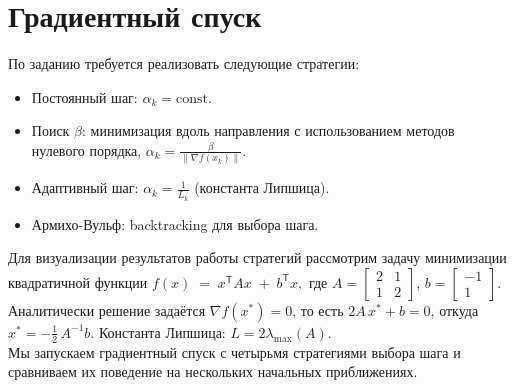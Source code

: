 \documentclass[a4paper,12pt]{article}
\begin{document}
\section{Градиентный спуск}
По заданию требуется реализовать следующие стратегии:
\begin{itemize}
    \item Постоянный шаг: $\alpha_k = \text{const}$.
    \item Поиск $\beta$: минимизация вдоль направления с использованием методов нулевого порядка, $\alpha_k = \frac{\beta}{\|\nabla f(x_k)\|}$.
    \item Адаптивный шаг: $\alpha_k = \frac{1}{L_k}$ (константа Липшица).
    \item Армихо-Вульф: backtracking для выбора шага.
\end{itemize}
Для визуализации результатов работы стратегий рассмотрим задачу минимизации квадратичной функции
$f(x) \;=\; x^\mathsf{T} A x \;+\; b^\mathsf{T} x,$
где $A = \begin{bmatrix} 2 & 1 \\ 1 & 2 \end{bmatrix}$, $b = \begin{bmatrix} -1 \\ 1 \end{bmatrix}$. \\[0.5em]
Аналитически решение задаётся $\nabla f(x^*)=0$, то есть $2A\,x^* + b=0$, откуда $x^* = -\tfrac12\,A^{-1} b$. Константа Липшица: $L = 2\lambda_{\max}(A)$.\\[0.5em]
Мы запускаем градиентный спуск с четырьмя стратегиями выбора шага и сравниваем их поведение на нескольких начальных приближениях.
\end{document}
